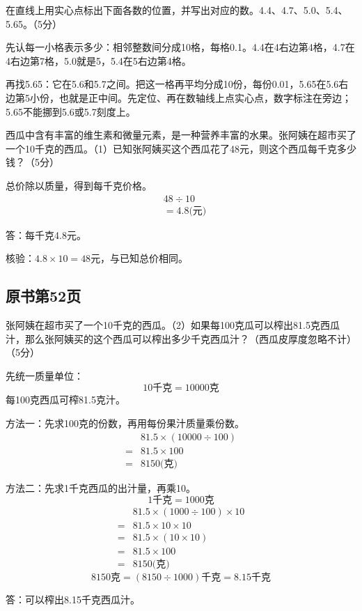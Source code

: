 在直线上用实心点标出下面各数的位置，并写出对应的数。4.4、4.7、5.0、5.4、5.65。（5分）\par
{}
\begin{BookAnswer}
先认每一小格表示多少：相邻整数间分成10格，每格0.1。4.4在4右边第4格，4.7在4右边第7格，5.0就是5，5.4在5右边第4格。\par 再找5.65：它在5.6和5.7之间。把这一格再平均分成10份，每份0.01，5.65在5.6右边第5小份，也就是正中间。先定位、再在数轴线上点实心点，数字标注在旁边；5.65不能挪到5.6或5.7刻度上。
\end{BookAnswer}

西瓜中含有丰富的维生素和微量元素，是一种营养丰富的水果。张阿姨在超市买了一个10千克的西瓜。（1）已知张阿姨买这个西瓜花了48元，则这个西瓜每千克多少钱？（5分）\par
\begin{BookAnswer}
总价除以质量，得到每千克价格。\[\begin{aligned}&48\div10\\&=4.8\text{(元)}\end{aligned}\]\par 答：每千克4.8元。\par 核验：\(4.8\times10=48\)元，与已知总价相同。
\end{BookAnswer}



\subsection*{原书第52页}

张阿姨在超市买了一个10千克的西瓜。（2）如果每100克瓜可以榨出81.5克西瓜汁，那么张阿姨买的这个西瓜可以榨出多少千克西瓜汁？（西瓜皮厚度忽略不计）（5分）\par
\begin{BookAnswer}
先统一质量单位：\[10\text{千克}=10000\text{克}\]每100克西瓜可榨81.5克汁。\par 方法一：先求100克的份数，再用每份果汁质量乘份数。\[\begin{aligned}&81.5\times(10000\div100)\\={}&81.5\times100\\={}&8150\text{(克)}\end{aligned}\]\par 方法二：先求1千克西瓜的出汁量，再乘10。\[1\text{千克}=1000\text{克}\]\[\begin{aligned}&81.5\times(1000\div100)\times10\\={}&81.5\times10\times10\\={}&81.5\times(10\times10)\\={}&81.5\times100\\={}&8150\text{(克)}\end{aligned}\]\[8150\text{克}=(8150\div1000)\text{千克}=8.15\text{千克}\]\par 答：可以榨出8.15千克西瓜汁。
\end{BookAnswer}


